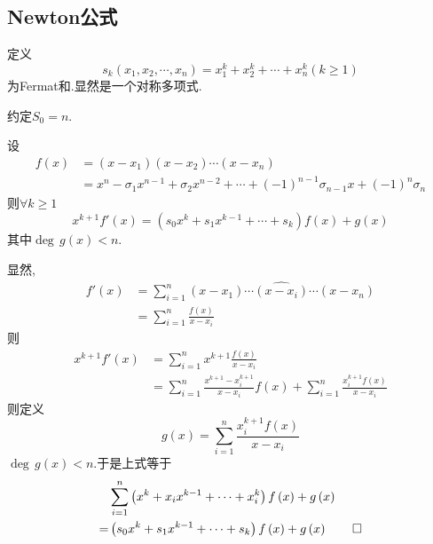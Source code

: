 \subsection{Newton公式}
\begin{formal}
\begin{definition}[Fermal和]\label{def:Fermat和}
    定义
    \[
    s_k\left(
        x_1,x_2,\cdots,x_n
    \right)=x_1^k+x_2^k+\cdots+x_n^k\left(
        k\geqslant 1
    \right)
    \]为\textup{Fermat}和.显然是一个对称多项式.

    约定$S_0=n.$
\end{definition}
\end{formal}
\begin{green}
\begin{lemma}[Fermat与形式导数]\label{lem:Fermat与形式导数}
    设\begin{align*}
        f\left(x\right)&=
    \left(x-x_1\right)\left(x-x_2\right)\cdots\left(x-x_n\right)\\
    &=x^n-\sigma_1x^{n-1} +\sigma_2x^{n-2}+\cdots+\left(-1\right)^{n-1}
    \sigma_{n-1}x+\left(-1\right)^n\sigma_n
    \end{align*}则$\forall k\geqslant 1$
    \[
     x^{k+1}f'\left(x\right)=\left(
        s_0x^k+s_1 x^{k-1}+\cdots+s_k
     \right)f\left(x\right)+g\left(x\right)\]
     其中$\deg\,g\left(x\right)<n.$
\end{lemma}
\begin{Proof}
显然,\begin{align*}
  f'\left(x\right)&=\sum_{i=1}^{n}\left(x-x_1\right)\cdots\widehat{
      \left(x-x_i\right)   
} \cdots\left(x-x_n\right)  \\
&=\sum_{i=1}^{n}\frac{
    f\left(x\right)
}{x-x_i}
\end{align*}
则
\begin{align*}
    x^{k+1}f'\left(x\right)&=\sum_{i=1}^{n}x^{k+1}\frac{
        f\left(x\right)
    }{x-x_i}\\
    &=\sum_{i=1}^{n}\frac{
        x^{k+1}-x_i^{k+1}
    }{x-x_i}f\left(x\right)+\sum_{i=1}^{n}\frac{x_i^{k+1}f\left(x\right)}{x-x_i}
\end{align*}
则定义\[
g\left(x\right)=\sum_{i=1}^{n}\frac{x_i^{k+1}f\left(x\right)}{x-x_i} 
\]$\deg\,g\left(x\right)<n$.于是上式等于
\begin{align*}
    &\sum_{i=1}^{n}
    \left(
        x^{k}+x_ix^{k-1}+\cdots+x_i^k
    \right)f\left(x\right)+g\left(x\right)\\
    =&
    \left(
        s_0x^k+s_1 x^{k-1}+\cdots+s_k
    \right)f\left(x\right)+g\left(x\right)\qedhere
\end{align*}
\end{Proof}
\end{green}
